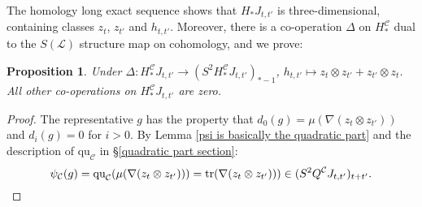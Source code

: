 \documentclass[11pt]{amsart} \renewcommand{\baselinestretch}{1.2}
\theoremstyle{plain}
\newtheorem{prop}[thm]{Proposition}
\numberwithin{equation}{section} %
\theoremstyle{plain}
\newtheorem{prop}[thm]{Proposition}
\numberwithin{equation}{chapter} %
\DeclareMathOperator{\trace}{tr}
\renewcommand{\to}{\longrightarrow}
\newcommand{\scrL}{\mathscr{L}}
\newcommand{\calc}{\mathcal{C}}
\newcommand{\LieOperad}{{\scrL}}
\newcommand{\quadratic}{\mathrm{qu}}
\newcommand{\Nabla}{\nabla}
\renewcommand{\mapsto}{\longmapsto}
\begin{document}
\begin{Operations on the Bousfield-Kan spectral sequence}
The homology long exact sequence shows that $H_*J_{t,t'}$ is three-dimensional, containing classes $ z_t$, $ z_{t'}$ and $h_{t,t'}$. Moreover, there is a co-operation $\Delta$ on $H_{*}^{\calc}$ dual to the $S(\LieOperad)$ structure map on cohomology, and we prove:
\begin{prop}
\label{prop on three cell}
Under $\Delta:H_*^{\calc}J_{t,t'}\to (S^2H_*^{\calc}J_{t,t'})_{*-1}$, $h_{t,t'}\mapsto z_t\otimes z_{t'}+ z_{t'}\otimes z_t$. All other co-operations on $H_*^{\calc}J_{t,t'}$ are zero.
\end{prop}
\begin{proof}
The representative $g$ has the property that $d_0(g)=\mu(\Nabla( z_t\otimes z_{t'}))$ and $d_i(g)=0$ for $i>0$. By Lemma \ref{psi is basically the quadratic part} and the description of $\quadratic_\calc$ in \S\ref{quadratic part section}:
\[\psi_\calc(g)=
\quadratic_\calc(\mu(\Nabla( z_t\otimes z_{t'})))=
\trace(\Nabla( z_t\otimes z_{t'})))\in (S^2Q^\calc J_{t,t'})_{t+t'}.\qedhere\]
\end{proof}


\end{Operations on the Bousfield-Kan spectral sequence}
\end{document}
